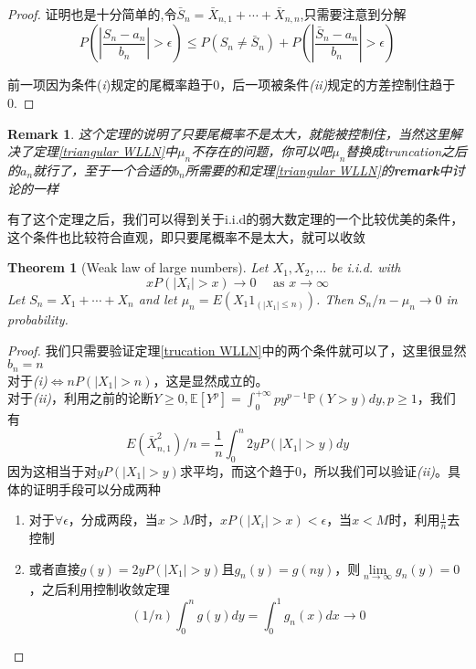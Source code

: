 \documentclass{article}
\newtheorem{theorem}{Theorem}[section]
\newtheorem*{proof}{Proof}
\newtheorem{remark}{Remark}[theorem]
\begin{document}
\begin{proof}
	证明也是十分简单的,令$
	\bar{S}_n=\bar{X}_{n, 1}+\cdots+\bar{X}_{n, n}
	$,只需要注意到分解
	$$P\left(\left|\frac{S_n-a_n}{b_n}\right|>\epsilon\right) \leq P\left(S_n \neq \bar{S}_n\right)+P\left(\left|\frac{\bar{S}_n-a_n}{b_n}\right|>\epsilon\right)$$
	
	前一项因为条件(\textit{i})规定的尾概率趋于0，后一项被条件\textit{(ii)}规定的方差控制住趋于0.
\end{proof}
\begin{remark}
	这个定理的说明了只要尾概率不是太大，就能被控制住，当然这里解决了定理\ref{triangular WLLN}中$\mu_n$不存在的问题，你可以吧$\mu_n$替换成truncation之后的$a_n$就行了，至于一个合适的$b_n$所需要的和定理\ref{triangular WLLN}的\textbf{remark}中讨论的一样
\end{remark}
有了这个定理之后，我们可以得到关于i.i.d的弱大数定理的一个比较优美的条件，这个条件也比较符合直观，即只要尾概率不是太大，就可以收敛
\begin{theorem}[Weak law of large numbers]
	\label{Weak law of large numbers}
	Let $X_1, X_2, \ldots$ be i.i.d. with
	$$
	x P\left(\left|X_i\right|>x\right) \rightarrow 0 \quad \text { as } x \rightarrow \infty
	$$
	Let $S_n=X_1+\cdots+X_n$ and let $\mu_n=E\left(X_1 1_{\left(\left|X_1\right| \leq n\right)}\right)$. Then $S_n / n-\mu_n \rightarrow 0$ in probability.
\end{theorem}
\begin{proof}
	我们只需要验证定理\ref{trucation WLLN}中的两个条件就可以了，这里很显然$b_n=n$\\
	对于\textit{(i)}$\Leftrightarrow nP(|X_1|>n)$，这是显然成立的。\\
	对于\textit{(ii)}，利用之前的论断$Y \geqslant 0, \mathbb{E} \left[Y^p\right]=\int_0^{+\infty} p y^{p-1} \mathbb{P}(Y>y) d y, p \geqslant 1$，我们有
	\begin{equation*}
		E\left(\bar{X}_{n, 1}^2\right) / n=\frac{1}{n} \int_0^n 2 y P\left(\left|X_1\right|>y\right) d y
	\end{equation*}
	因为这相当于对$y P\left(\left|X_1\right|>y\right)$求平均，而这个趋于0，所以我们可以验证\textit{(ii)}。具体的证明手段可以分成两种
	\begin{enumerate}
		\item 对于$\forall \epsilon$，分成两段，当$x>M$时，$x P\left(\left|X_i\right|>x\right)<\epsilon$，当$x<M$时，利用$\frac{1}{n}$去控制
		\item 或者直接$g(y)=2 y P\left(\left|X_1\right|>y\right)$且$g_n(y)=g(ny)$，则$\lim\limits_{n\to \infty}g_n(y)=0$，之后利用控制收敛定理
		\begin{equation*}
			(1 / n) \int_0^n g(y) d y=\int_0^1 g_n(x) d x \rightarrow 0
		\end{equation*}
	\end{enumerate}
\end{proof}
\end{document}
